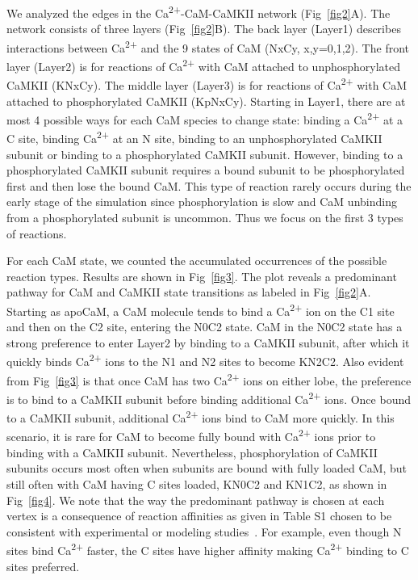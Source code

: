 \documentclass[10pt,letterpaper]{article}
\begin{document}
We analyzed the edges in the Ca\textsuperscript{2+}-CaM-CaMKII network (Fig~\ref{fig2}A). The network consists of three layers (Fig~\ref{fig2}B). The back layer (Layer1) describes interactions between Ca\textsuperscript{2+} and the 9 states of CaM (NxCy, x,y=0,1,2). The front layer (Layer2) is for reactions of Ca\textsuperscript{2+} with CaM attached to unphosphorylated CaMKII (KNxCy). The middle layer (Layer3) is for reactions of Ca\textsuperscript{2+} with CaM attached to phosphorylated CaMKII (KpNxCy). Starting in Layer1, there are at most 4 possible ways for each CaM species to change state: binding a Ca\textsuperscript{2+} at a C site, binding Ca\textsuperscript{2+} at an N site, binding to an unphosphorylated CaMKII subunit or binding to a phosphorylated CaMKII subunit. However, binding to a phosphorylated CaMKII subunit requires a bound subunit to be phosphorylated first and then lose the bound CaM. This type of reaction rarely occurs during the early stage of the simulation since phosphorylation is slow and CaM unbinding from a phosphorylated subunit is uncommon. Thus we focus on the first 3 types of reactions.

For each CaM state, we counted the accumulated occurrences of the possible reaction types. Results are shown in Fig~\ref{fig3}. The plot reveals a predominant pathway for CaM and CaMKII state transitions as labeled in Fig~\ref{fig2}A. Starting as apoCaM, a CaM molecule tends to bind a Ca\textsuperscript{2+} ion on the C1 site and then on the C2 site, entering the N0C2 state. CaM in the N0C2 state has a strong preference to enter Layer2 by binding to a CaMKII subunit, after which it quickly binds Ca\textsuperscript{2+} ions to the N1 and N2 sites to become KN2C2. Also evident from Fig~\ref{fig3} is that once CaM has two Ca\textsuperscript{2+} ions on either lobe, the preference is to bind to a CaMKII subunit before binding additional Ca\textsuperscript{2+} ions. Once bound to a CaMKII subunit, additional Ca\textsuperscript{2+} ions bind to CaM more quickly. In this scenario, it is rare for CaM to become fully bound with Ca\textsuperscript{2+} ions prior to binding with a CaMKII subunit. Nevertheless, phosphorylation of CaMKII subunits occurs most often when subunits are bound with fully loaded CaM, but still often with CaM having C sites loaded, KN0C2 and KN1C2, as shown in Fig~\ref{fig4}. We note that the way the predominant pathway is chosen at each vertex is a consequence of reaction affinities as given in Table S1 chosen to be consistent with experimental or modeling studies~\cite{Pepke:2010ju,Zeng:2010bq,Lucic:2008gt}. For example, even though N sites bind Ca\textsuperscript{2+} faster, the C sites have higher affinity making Ca\textsuperscript{2+} binding to C sites preferred. 
\end{document}
